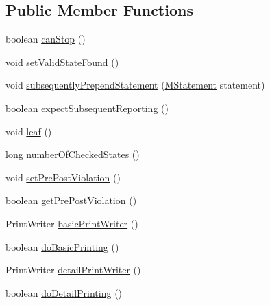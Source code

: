 \subsection*{Public Member Functions}
\begin{DoxyCompactItemize}
\item 
boolean \hyperlink{interfaceorg_1_1tzi_1_1use_1_1gen_1_1assl_1_1dynamics_1_1_i_g_collector_aa41ec908c678b998b7995834e5cfce5f}{can\-Stop} ()
\item 
void \hyperlink{interfaceorg_1_1tzi_1_1use_1_1gen_1_1assl_1_1dynamics_1_1_i_g_collector_a26da60a0548c3eb2eaaca4e5e016313b}{set\-Valid\-State\-Found} ()
\item 
void \hyperlink{interfaceorg_1_1tzi_1_1use_1_1gen_1_1assl_1_1dynamics_1_1_i_g_collector_adbb7b0a47b8ea737f43c251b71414cf4}{subsequently\-Prepend\-Statement} (\hyperlink{classorg_1_1tzi_1_1use_1_1uml_1_1sys_1_1soil_1_1_m_statement}{M\-Statement} statement)
\item 
boolean \hyperlink{interfaceorg_1_1tzi_1_1use_1_1gen_1_1assl_1_1dynamics_1_1_i_g_collector_a4734cccb827caf57a4d0221f8f8bef8d}{expect\-Subsequent\-Reporting} ()
\item 
void \hyperlink{interfaceorg_1_1tzi_1_1use_1_1gen_1_1assl_1_1dynamics_1_1_i_g_collector_aaa080a3c0c2ac7a7bab93424b4c812e7}{leaf} ()
\item 
long \hyperlink{interfaceorg_1_1tzi_1_1use_1_1gen_1_1assl_1_1dynamics_1_1_i_g_collector_ab245d94d35edfb6ef48a696b03baeece}{number\-Of\-Checked\-States} ()
\item 
void \hyperlink{interfaceorg_1_1tzi_1_1use_1_1gen_1_1assl_1_1dynamics_1_1_i_g_collector_a9512ea2f4f02e8b8dafa79bc2d73726f}{set\-Pre\-Post\-Violation} ()
\item 
boolean \hyperlink{interfaceorg_1_1tzi_1_1use_1_1gen_1_1assl_1_1dynamics_1_1_i_g_collector_a9ca21d12df3847beb463e36bb73382d1}{get\-Pre\-Post\-Violation} ()
\item 
Print\-Writer \hyperlink{interfaceorg_1_1tzi_1_1use_1_1gen_1_1assl_1_1dynamics_1_1_i_g_collector_a4b217a471d4256fd3c7790cd812f5679}{basic\-Print\-Writer} ()
\item 
boolean \hyperlink{interfaceorg_1_1tzi_1_1use_1_1gen_1_1assl_1_1dynamics_1_1_i_g_collector_ad87828cb13f2c9b4956275e9afc3b22e}{do\-Basic\-Printing} ()
\item 
Print\-Writer \hyperlink{interfaceorg_1_1tzi_1_1use_1_1gen_1_1assl_1_1dynamics_1_1_i_g_collector_a4ccd59732facb0b2e230940c80e02d6e}{detail\-Print\-Writer} ()
\item 
boolean \hyperlink{interfaceorg_1_1tzi_1_1use_1_1gen_1_1assl_1_1dynamics_1_1_i_g_collector_ab609c2481bc76fa071d74b97c6cbf076}{do\-Detail\-Printing} ()

\end{DoxyCompactItemize}
